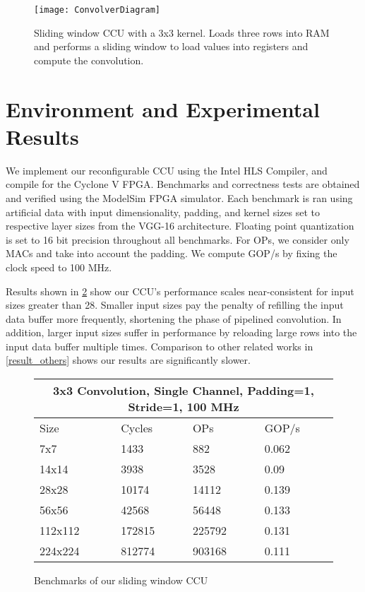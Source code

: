 \begin{figure}
	\centering
	\texttt{[image: ConvolverDiagram]}
	\caption[Convolver Diagram]%
	{\narrower Sliding window CCU with a 3x3 kernel. Loads three rows into RAM and performs a sliding window to load values into registers and compute the convolution.}
	\label{convolver}
\end{figure}


\section{Environment and Experimental Results}
We implement our reconfigurable CCU using the Intel HLS Compiler, and compile for the Cyclone V FPGA. Benchmarks and correctness tests are obtained and verified using the ModelSim FPGA simulator. Each benchmark is ran using artificial data with input dimensionality, padding, and kernel sizes set to respective layer sizes from the VGG-16 architecture. Floating point quantization is set to 16 bit precision throughout all benchmarks. For OPs, we consider only MACs and take into account the padding. We compute GOP/s by fixing the clock speed to 100 MHz.

Results shown in \ref{result_1} show our CCU's performance scales near-consistent for input sizes greater than 28. Smaller input sizes pay the penalty of refilling the input data buffer more frequently, shortening the phase of pipelined convolution. In addition, larger input sizes suffer in performance by reloading large rows into the input data buffer multiple times. Comparison to other related works in \ref{result_others} shows our results are significantly slower.


\begin{figure}
\centering
\small
\begin{tabular}{ |p{3cm}|p{3cm}|p{3cm}|p{3cm}|  }
	\hline
	\multicolumn{4}{|c|}{3x3 Convolution, Single Channel, Padding=1, Stride=1, 100 MHz} \\
	\hline
	Size & Cycles & OPs & GOP/s \\
	\hline
	7x7       & 1433      & 882      & 0.062\\
	14x14    & 3938     & 3528    & 0.09 \\
	28x28   & 10174    & 14112    & 0.139\\
	56x56   & 42568   & 56448  & 0.133\\
	112x112  & 172815  & 225792 & 0.131 \\
	224x224 & 812774  & 903168 & 0.111\\
	
	\hline
\end{tabular}
\label{result_1}
\caption{Benchmarks of our sliding window CCU}
\end{figure}

